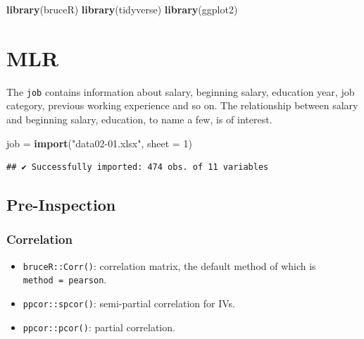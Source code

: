 \documentclass[
]{ctexart}
\newenvironment{Shaded}{\begin{snugshade}}{\end{snugshade}}
\newcommand{\AttributeTok}[1]{\textcolor[rgb]{0.13,0.29,0.53}{#1}}
\newcommand{\DecValTok}[1]{\textcolor[rgb]{0.00,0.00,0.81}{#1}}
\newcommand{\FunctionTok}[1]{\textcolor[rgb]{0.13,0.29,0.53}{\textbf{#1}}}
\newcommand{\NormalTok}[1]{#1}
\newcommand{\OtherTok}[1]{\textcolor[rgb]{0.56,0.35,0.01}{#1}}
\newcommand{\StringTok}[1]{\textcolor[rgb]{0.31,0.60,0.02}{#1}}
\providecommand{\tightlist}{%
  \setlength{\itemsep}{0pt}\setlength{\parskip}{0pt}}
\begin{document}
\begin{Shaded}
\begin{Highlighting}[]
\FunctionTok{library}\NormalTok{(bruceR)}
\FunctionTok{library}\NormalTok{(tidyverse)}
\FunctionTok{library}\NormalTok{(ggplot2)}
\end{Highlighting}
\end{Shaded}

\hypertarget{mlr-1}{%
\section{MLR}\label{mlr-1}}

The \texttt{job} contains information about salary, beginning salary,
education year, job category, previous working experience and so on. The
relationship between salary and beginning salary, education, to name a
few, is of interest.

\begin{Shaded}
\begin{Highlighting}[]
\NormalTok{job }\OtherTok{=} \FunctionTok{import}\NormalTok{(}\StringTok{"data02{-}01.xlsx"}\NormalTok{, }\AttributeTok{sheet =} \DecValTok{1}\NormalTok{)}
\end{Highlighting}
\end{Shaded}

\begin{verbatim}
## ✔ Successfully imported: 474 obs. of 11 variables
\end{verbatim}

\hypertarget{pre-inspection-2}{%
\subsection{Pre-Inspection}\label{pre-inspection-2}}

\hypertarget{correlation}{%
\subsubsection{Correlation}\label{correlation}}

\begin{itemize}
\tightlist
\item
  \texttt{bruceR::Corr()}: correlation matrix, the default method of
  which is
  \texttt{method\ =\ \textquotesingle{}pearson\textquotesingle{}}.
\item
  \texttt{ppcor::spcor()}: semi-partial correlation for IVs.
\item
  \texttt{ppcor::pcor()}: partial correlation.
\end{itemize}
\end{document}
